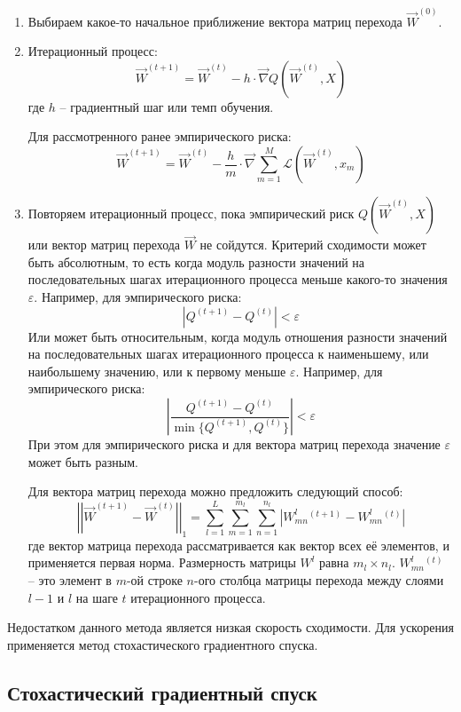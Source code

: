 \begin{enumerate}
	\item Выбираем какое-то начальное приближение вектора матриц перехода $\overrightarrow{W}^{(0)}$.
	
	\item Итерационный процесс:
		$$
		\overrightarrow{W}^{(t+1)} = \overrightarrow{W}^{(t)} - h \cdot \overrightarrow{\nabla} Q(\overrightarrow{W}^{(t)}, X)
		$$
		где $h$ -- градиентный шаг или темп обучения.
		
		Для рассмотренного ранее эмпирического риска:
		$$
		\overrightarrow{W}^{(t+1)} = \overrightarrow{W}^{(t)} - \frac{h}{m} \cdot \overrightarrow{\nabla} \sum\limits_{m = 1}^{M} \mathcal{L} (\overrightarrow{W}^{(t)}, x_m)
		$$
		
	\item Повторяем итерационный процесс, пока эмпирический риск $Q(\overrightarrow{W}^{(t)}, X)$ или вектор матриц перехода $\overrightarrow{W}$ не сойдутся. Критерий сходимости может быть абсолютным, то есть когда модуль разности значений на последовательных шагах итерационного процесса меньше какого-то значения $\varepsilon$. Например, для эмпирического риска:
	$$
	\left| Q^{(t + 1)} - Q^{(t)} \right| < \varepsilon
	$$
	Или может быть относительным, когда модуль отношения разности значений на последовательных шагах итерационного процесса к наименьшему, или наибольшему значению, или к первому меньше $\varepsilon$. Например, для эмпирического риска:
	$$
	\left| \frac{Q^{(t + 1)} - Q^{(t)}}{\min \{ Q^{(t + 1)}, Q^{(t)} \} } \right| < \varepsilon
	$$
	При этом для эмпирического риска и для вектора матриц перехода значение $\varepsilon$ может быть разным.
	
	Для вектора матриц перехода можно предложить следующий способ:
	$$
	\left|\left| \overrightarrow{W}^{(t+1)} - \overrightarrow{W}^{(t)} \right|\right|_1 = \sum\limits_{l = 1}^{L} \sum\limits_{m = 1}^{m_l} \sum\limits_{n = 1}^{n_l} |W^l_{mn}{}^{(t+1)} - W^l_{mn}{}^{(t)}|
	$$
	где вектор матрица перехода рассматривается как вектор всех её элементов, и применяется первая норма. Размерность матрицы $W^l$ равна $m_l \times n_l$. $W^l_{mn}{}^{(t)}$ -- это элемент в $m$-ой строке $n$-ого столбца матрицы перехода между слоями $l-1$ и $l$ на шаге $t$ итерационного процесса.
\end{enumerate}

Недостатком данного метода является низкая скорость сходимости. Для ускорения применяется метод стохастического градиентного спуска.

\subsection{Стохастический градиентный спуск}

